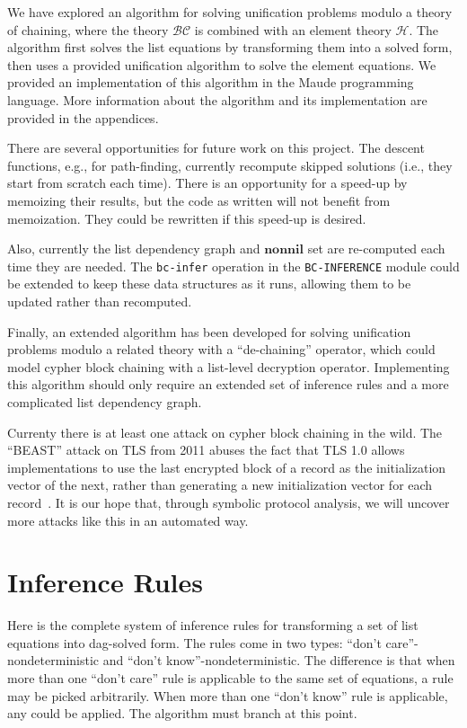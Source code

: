 \documentclass[11pt]{article}
\newcommand{\BC}{\mathcal{BC}}
\newcommand{\HH}{\mathcal{H}}
\newcommand{\Nonnil}{\mathbf{nonnil}}
\begin{document}
We have explored an algorithm for solving unification problems modulo a theory
of chaining, where the theory $\BC$ is combined with an element theory $\HH$.
The algorithm first solves the list equations by transforming them into a
solved form, then uses a provided unification algorithm to solve the element
equations. We provided an implementation of this algorithm in the Maude
programming language. More information about the algorithm and its
implementation are provided in the appendices.

There are several opportunities for future work on this project. The descent
functions, e.g., for path-finding, currently recompute skipped solutions (i.e.,
they start from scratch each time). There is an opportunity for a speed-up by
memoizing their results, but the code as written will not benefit from
memoization. They could be rewritten if this speed-up is desired.

Also, currently the list dependency graph and $\Nonnil$ set are re-computed
each time they are needed. The \lstinline|bc-infer| operation in the
\lstinline|BC-INFERENCE| module could be extended to keep these data structures
as it runs, allowing them to be updated rather than recomputed.

Finally, an extended algorithm has been developed for solving unification
problems modulo a related theory with a ``de-chaining'' operator, which could
model cypher block chaining with a list-level decryption operator. Implementing
this algorithm should only require an extended set of inference rules and a
more complicated list dependency graph.

Currenty there is at least one attack on cypher block chaining in the wild.
The ``BEAST'' attack on TLS from 2011 abuses the fact that TLS 1.0 allows
implementations to use the last encrypted block of a record as the
initialization vector of the next, rather than generating a new initialization
vector for each record~\cite{ekr2011security}. It is our hope that,
through symbolic protocol analysis, we will uncover more attacks like this in
an automated way.



\clearpage
\appendix

\section{Inference Rules}\label{appendix:inference}

Here is the complete system of inference rules for transforming a set of list
equations into dag-solved form. The rules come in two types: ``don't
care''-nondeterministic and ``don't know''-nondeterministic. The difference
is that when more than one ``don't care'' rule is applicable to the same
set of equations, a rule may be picked arbitrarily. When more than one ``don't
know'' rule is applicable, any could be applied. The algorithm must branch at
this point.
\end{document}
